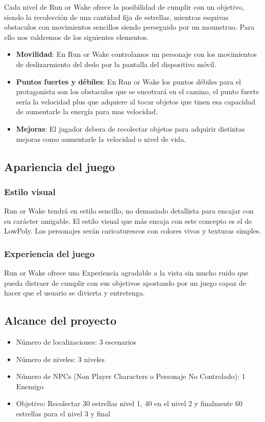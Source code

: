 Cada nivel de Run or Wake ofrece la posibilidad de cumplir con un objetivo,
siendo la recolección de una cantidad fija de estrellas, mientras
esquivas obstaculos con movimientos sencillos siendo perseguido por
un mounstruo. Para ello nos valdremos de los siguientes elementos.

\begin{itemize}
	\item \textbf{Movilidad}: En Run or Wake controlamos un personaje
	      con los movimientos de deslizarmiento del dedo por la pantalla del
	      dispositivo móvil.
	\item \textbf{Puntos fuertes y débiles}: En Run or Wake los puntos
	      débiles para el protagonista son los obstaculos que se encotrará
	      en el camino, el punto fuerte sería la velocidad plus que adquiere
	      al tocar objetos que tinen esa capacidad de aumentarle la energía
	      para mas velocidad.
	\item \textbf{Mejoras}: El jugador debera de recolectar objetos para
	      adquirir distintas mejoras como aumentarle la velocidad o nivel de
	      vida.
\end{itemize}

\subsection{Apariencia del juego}
\subsubsection{Estilo visual}
Run or Wake tendrá en estilo sencillo, no demasiado detallista para encajar
con su carácter amigable. El estilo visual que más encaja con este concepto
es el de LowPoly. Los personajes serán caricaturescos con colores vivos y
texturas simples.

\subsubsection{Experiencia del juego}

Run or Wake ofrece una Experiencia agradable a la vista sin mucho ruido que
pueda distraer de cumplir con sus objetivos apostando por un juego capaz de
hacer que el usuario se divierta y entretenga.

\subsection{Alcance del proyecto}

\begin{itemize}
	\item Número de localizaciones: 3 escenarios
	\item Número de niveles: 3 niveles
	\item Número de NPCs (Non Player Characters o Personaje No Controlado): 1 Enemigo
	\item Objetivo: Recolectar 30 estrellas nivel 1, 40 en el nivel 2 y finalmente 60
	      estrellas para el nivel 3 y final
\end{itemize}
